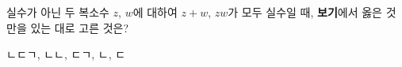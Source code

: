 실수가 아닌 두 복소수 $z$, $w$에 대하여 $z+w$, $zw$가 모두 실수일 때, \textbf{보기}에서 옳은 것만을 있는 대로 고른 것은?  
\begin{choices32}{ㄴ}{ㄷ}{ㄱ, ㄴ}{ㄴ, ㄷ}{ㄱ, ㄴ, ㄷ}\end{choices32}
